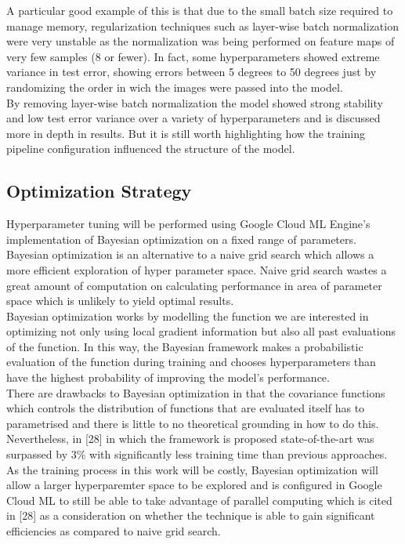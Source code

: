 \documentclass{article}
\begin{document}
A particular good example of this is that due to the small batch size required to manage memory, regularization techniques such as layer-wise batch normalization were very unstable as the normalization was being performed on feature maps of very few samples (8 or fewer). In fact, some hyperparameters showed extreme variance in test error, showing errors between 5 degrees to 50 degrees just by randomizing the order in wich the images were passed into the model. \\

By removing layer-wise batch normalization the model showed strong stability and low test error variance over a variety of hyperparameters and is discussed more in depth in results.  But it is still worth highlighting how the training pipeline configuration influenced the structure of the model. \\


\subsection{Optimization Strategy}

Hyperparameter tuning will be performed using Google Cloud ML Engine's implementation of Bayesian optimization on a fixed range of parameters. Bayesian optimization is an alternative to a naive grid search which allows a more efficient exploration of hyper parameter space. Naive grid search wastes a great amount of computation on calculating performance in area of parameter space which is unlikely to yield optimal results.\\

Bayesian optimization works by modelling the function we are interested in optimizing not only using local gradient information but also all past evaluations of the function. In this way, the Bayesian framework makes a probabilistic evaluation of the function during training and chooses hyperparameters than have the highest probability of improving the model's performance.\\

 There are drawbacks to Bayesian optimization in that the covariance functions which controls the distribution of functions that are evaluated itself has to parametrised and there is little to no theoretical grounding in how to do this. Nevertheless, in [28] in which the framework is proposed state-of-the-art was surpassed by 3\% with significantly less training time than previous approaches. As the training process in this work will be costly, Bayesian optimization will allow a larger hyperparemter space to be explored and is configured in Google Cloud ML to still be able to take advantage of parallel computing which is cited in [28] as a consideration on whether the technique is able to gain significant efficiencies as compared to naive grid search. \\
 
\end{document}
